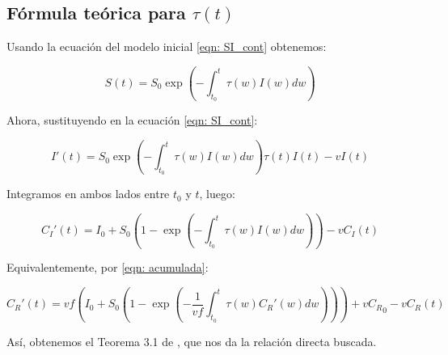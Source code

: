 \subsection{Fórmula teórica para $\tau (t)$}

Usando la ecuación del modelo inicial \eqref{eqn: SI_cont} obtenemos:

$$S(t) = S_0 \exp{\left( - \int_{t_0}^t \tau(w) I(w) dw \right) } $$ 

Ahora, sustituyendo en la ecuación \eqref{eqn: SI_cont}:

$$I'(t) = S_0 \exp{\left( - \int_{t_0}^t \tau(w) I(w) dw \right) } \tau (t) I(t) -vI(t) $$

Integramos en ambos lados entre $t_0$ y $t$, luego:

$$ C_I'(t) = I_0 + S_0 \left( 1-\exp{\left(- \int_{t_0}^t \tau (w) I(w)dw \right)}\right) -vC_I(t)$$

Equivalentemente, por \eqref{eqn: acumulada}:

$$C_R'(t) = vf\left( I_0 + S_0 \left( 1-\exp{\left(- \frac{1}{vf}\int_{t_0}^t \tau (w ) C_R'(w)dw \right)}\right)\right) +v{C_R}_0 -vC_R(t)$$

Así, obtenemos el Teorema 3.1 de \cite{demongeotSIEpidemicModel}, que nos da la relación directa buscada.







